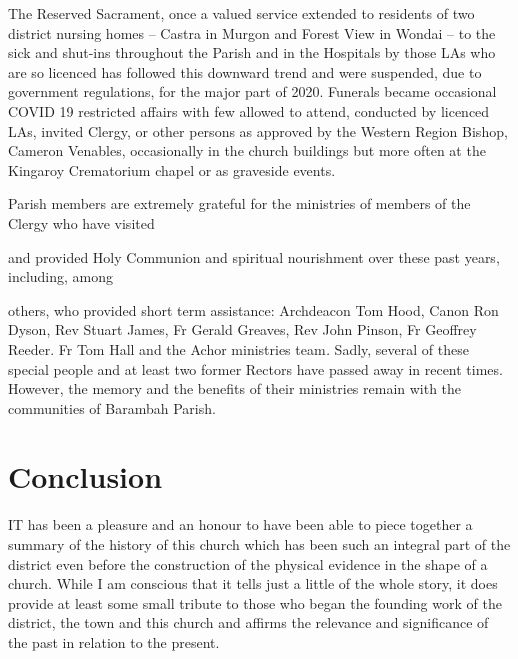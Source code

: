 The Reserved Sacrament, once a valued service extended to residents of two district nursing homes -- Castra in Murgon and Forest View in Wondai -- to the sick and shut-ins throughout the Parish and in the Hospitals by those LAs who are so licenced has followed this downward trend and were suspended, due to government regulations, for the major part of 2020. Funerals became occasional COVID 19 restricted affairs with few allowed to attend, conducted by licenced LAs, invited Clergy, or other persons as approved by the Western Region Bishop, Cameron Venables, occasionally in the church buildings but more often at the Kingaroy Crematorium chapel or as graveside events.



Parish members are extremely grateful for the ministries of members of the Clergy who have visited



and provided Holy Communion and spiritual nourishment over these past years, including, among



others, who provided short term assistance: Archdeacon Tom Hood, Canon Ron Dyson, Rev Stuart James, Fr Gerald Greaves, Rev John Pinson, Fr Geoffrey Reeder. Fr Tom Hall and the Achor ministries team\emph{.} Sadly, several of these special people and at least two former Rectors have passed away in recent times. However, the memory and the benefits of their ministries remain with the communities of Barambah Parish.



\balance


\printendnotes[custom]
\setcounter{endnote}{0}
\chapter{Conclusion}
\nobalance


\lettrine[lines=3]{I}{T}
 has been a pleasure and an honour to have been able to piece together a summary of the history of this church which has been such an integral part of the district even before the construction of the physical evidence in the shape of a church. While I am conscious that it tells just a little of the whole story, it does provide at least some small tribute to those who began the founding work of the district, the town and this church and affirms the relevance and significance of the past in relation to the present.

